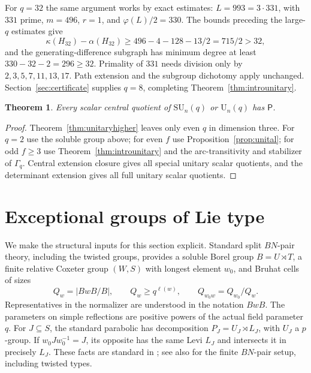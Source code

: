 \documentclass[11pt]{article}
\newtheorem{theorem}{Theorem}[section]
\theoremstyle{definition}
\newcommand{\Pp}{\mathsf P}
\newcommand{\SU}{\mathrm{SU}}
\newcommand{\U}{\mathrm U}
\begin{document}
For $q=32$ the same argument works by exact estimates: $L=993=3\cdot331$, with $331$ prime, $m=496$, $r=1$, and $\varphi(L)/2=330$. The bounds preceding the large-$q$ estimates give
\[
\kappa(H_{32})-\alpha(H_{32})\ge496-4-128-13/2=715/2>32,
\]
and the generating-difference subgraph has minimum degree at least $330-32-2=296\ge32$. Primality of $331$ needs division only by $2,3,5,7,11,13,17$. Path extension and the subgroup dichotomy apply unchanged. Section~\ref{sec:certificate} supplies $q=8$, completing Theorem~\ref{thm:introunitary}.

\begin{theorem}\label{thm:unitaryall}
Every scalar central quotient of $\SU_n(q)$ or $\U_n(q)$ has $\Pp$.
\end{theorem}
\begin{proof}
Theorem~\ref{thm:unitaryhigher} leaves only even $q$ in dimension three. For $q=2$ use the soluble group above; for even $f$ use Proposition~\ref{prop:unital}; for odd $f\ge3$ use Theorem~\ref{thm:introunitary} and the arc-transitivity and stabilizer of $\Gamma_q$. Central extension closure gives all special unitary scalar quotients, and the determinant extension gives all full unitary scalar quotients.
\end{proof}

\section{Exceptional groups of Lie type}\label{sec:exceptional}
We make the structural inputs for this section explicit. Standard split $BN$-pair theory, including the twisted groups, provides a soluble Borel group $B=U\rtimes T$, a finite relative Coxeter group $(W,S)$ with longest element $w_0$, and Bruhat cells of sizes
\[
Q_w=|BwB/B|,\qquad Q_w\ge q^{\ell(w)},\qquad
Q_{w_0w}=Q_{w_0}/Q_w.
\]
Representatives in the normalizer are understood in the notation $BwB$. The parameters on simple reflections are positive powers of the actual field parameter $q$. For $J\subseteq S$, the standard parabolic has decomposition $P_J=U_J\rtimes L_J$, with $U_J$ a $p$-group. If $w_0Jw_0^{-1}=J$, its opposite has the same Levi $L_J$ and intersects it in precisely $L_J$. These facts are standard in \cite{CarterSimple,CarterFinite}; see also \cite[Section 2]{Garonzi} for the finite $BN$-pair setup, including twisted types.
\end{document}
